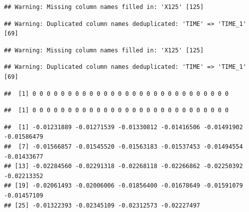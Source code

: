 \documentclass[
]{krantz}
\makeatletter
\newenvironment{Shaded}{\begin{snugshade}}{\end{snugshade}}
\newcommand{\NormalTok}[1]{#1}
\newcommand{\OperatorTok}[1]{\textcolor[rgb]{0.81,0.36,0.00}{\textbf{#1}}}
\newcommand{\StringTok}[1]{\textcolor[rgb]{0.31,0.60,0.02}{#1}}
\newenvironment{kframe}{%
\medskip{}
\setlength{\fboxsep}{.8em}
 \def\at@end@of@kframe{}%
 \ifinner\ifhmode%
  \def\at@end@of@kframe{\end{minipage}}%
  \begin{minipage}{\columnwidth}%
 \fi\fi%
 \def\FrameCommand##1{\hskip\@totalleftmargin \hskip-\fboxsep
 \colorbox{shadecolor}{##1}\hskip-\fboxsep
     \hskip-\linewidth \hskip-\@totalleftmargin \hskip\columnwidth}%
 \MakeFramed {\advance\hsize-\width
   \@totalleftmargin\z@ \linewidth\hsize
   \@setminipage}}%
 {\par\unskip\endMakeFramed%
 \at@end@of@kframe}
\renewenvironment{Shaded}{\begin{kframe}}{\end{kframe}}
\makeatother
\begin{document}
\begin{verbatim}
## Warning: Missing column names filled in: 'X125' [125]
\end{verbatim}

\begin{verbatim}
## Warning: Duplicated column names deduplicated: 'TIME' => 'TIME_1' [69]
\end{verbatim}

\begin{verbatim}
## Warning: Missing column names filled in: 'X125' [125]
\end{verbatim}

\begin{verbatim}
## Warning: Duplicated column names deduplicated: 'TIME' => 'TIME_1' [69]
\end{verbatim}

\begin{Shaded}
\end{Shaded}

\begin{verbatim}
##  [1] 0 0 0 0 0 0 0 0 0 0 0 0 0 0 0 0 0 0 0 0 0 0 0 0 0 0 0 0
\end{verbatim}

\begin{Shaded}
\end{Shaded}

\begin{verbatim}
##  [1] 0 0 0 0 0 0 0 0 0 0 0 0 0 0 0 0 0 0 0 0 0 0 0 0 0 0 0 0
\end{verbatim}

\begin{Shaded}
\end{Shaded}

\begin{verbatim}
##  [1] -0.01231889 -0.01271539 -0.01330812 -0.01416506 -0.01491902 -0.01586479
##  [7] -0.01566857 -0.01545520 -0.01563183 -0.01537453 -0.01494554 -0.01433677
## [13] -0.02284560 -0.02291318 -0.02268118 -0.02266862 -0.02250392 -0.02213352
## [19] -0.02061493 -0.02006006 -0.01856400 -0.01678649 -0.01591079 -0.01457109
## [25] -0.01322393 -0.02345109 -0.02312573 -0.02227497
\end{verbatim}
\end{document}
